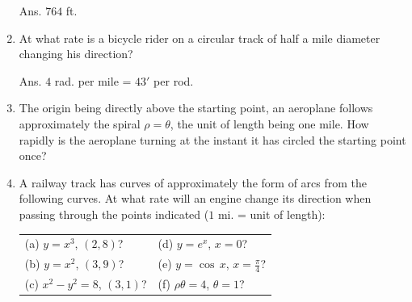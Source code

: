 \begin{enumerate}
Ans. $764$ ft.

\item
At what rate is a bicycle rider on a circular track of 
half a mile diameter changing his direction?

Ans. $4$ rad. per mile = $43'$ per rod.

\item
The origin being directly above the starting point, an aeroplane 
follows approximately the spiral $\rho = \theta$, the unit of 
length being one mile. How rapidly is the aeroplane turning at 
the instant it has circled the starting point once?

\item
A railway track has curves of approximately the form of 
arcs from the following curves. At what rate will an engine 
change its direction when passing through the points 
indicated ($1$ mi. = unit of length):

\begin{tabular}{ll}
(a) $y = x^3$, $(2,8)$? &	
(d) $y = e^x$, $x = 0$?\\
(b) $y = x^2$, $(3,9)$? &
(e) $y = \cos\, x$, $x = \frac{\pi}{4}$?\\
(c) $x^2 - y^2 = 8$, $(3,1)$? &
(f) $\rho\theta = 4$, $\theta = 1$?\\
\end{tabular}

\end{enumerate}
